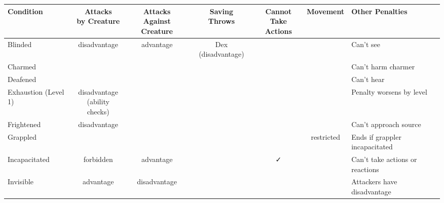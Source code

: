 \documentclass[12pt,letterpaper,landscape]{article}
\begin{document}
\renewcommand{\arraystretch}{1.5}
\setlength{\tabcolsep}{3pt}

\begin{table}[h!]
\centering
\begin{tabular}{@{}l c c c c c l@{}}
\toprule
\textbf{Condition} & \parbox[t]{2.5cm}{\centering Attacks \\ by Creature} 
                   & \parbox[t]{2.5cm}{\centering Attacks \\ Against Creature} 
                   & \parbox[t]{2.5cm}{\centering Saving \\ Throws} 
                   & \parbox[t]{1.5cm}{\centering Cannot \\ Take Actions} 
                   & \parbox[t]{1.5cm}{\centering Movement} 
                   & \textbf{Other Penalties} \\ \midrule
{}
Blinded            & disadvantage   & advantage    & Dex (disadvantage)         &               &                       & Can't see \\ 
Charmed            &                &              &                            &               &                       & Can't harm charmer \\ 
Deafened           &                &              &                            &               &                       & Can't hear \\ 
Exhaustion (Level 1) & \parbox{2.5cm}{\centering disadvantage \\ (ability checks)} 
                                   &              &                            &               &                       & Penalty worsens by level \\ 
Frightened         & disadvantage   &              &                            &               &                       & Can't approach source \\ 
Grappled           &                &              &                            &               & restricted            & Ends if grappler incapacitated \\ 
Incapacitated      & forbidden      & advantage    &                            & ✓             &                       & Can't take actions or reactions \\ 
Invisible          & advantage      & disadvantage &                            &               &                       & Attackers have disadvantage \\ 

\end{tabular}
\end{table}
\end{document}
